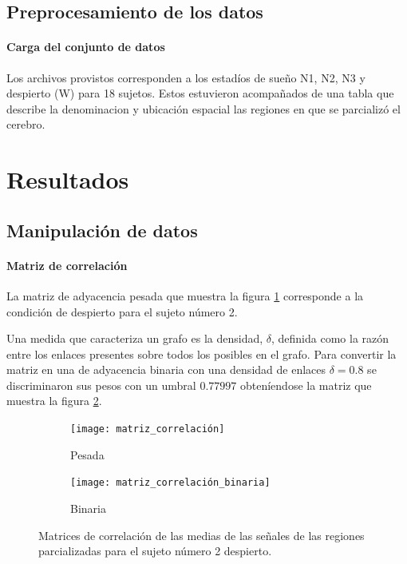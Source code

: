 \documentclass{article}
\begin{document}
\subsection{Preprocesamiento de los datos}

\paragraph{Carga del conjunto de datos} 
Los archivos provistos corresponden a los estadíos de sueño N1, N2, N3 y despierto (W) para 18 sujetos.
Estos estuvieron acompañados de una tabla que describe la denominacion y  ubicación espacial las regiones en que se parcializó el cerebro.



\section{Resultados}

\subsection{Manipulación de datos}

\paragraph{Matriz de correlación}
La matriz de adyacencia pesada que muestra la figura \ref{fg:matriz_correlación_pesada} corresponde a la condición de despierto para el sujeto número 2.

Una medida que caracteriza un grafo es la densidad, $\delta$, definida como la razón entre los enlaces presentes sobre todos los posibles en el grafo.
Para convertir la matriz en una de adyacencia binaria con una densidad de enlaces \(\delta = 0.8\) se discriminaron sus pesos con un umbral \(0.77997\) obteníendose la matriz que muestra la figura \ref{fg:matriz_correlación_binaria}.

\begin{figure}[ht]
	\centering
	\begin{subfigure}[b]{0.39\textwidth}
		\texttt{[image: matriz\_correlación]}
		\caption{Pesada}
		\label{fg:matriz_correlación_pesada}
	\end{subfigure}
	\begin{subfigure}[b]{0.33\textwidth}
		\texttt{[image: matriz\_correlación\_binaria]}
		\caption{Binaria}
		\label{fg:matriz_correlación_binaria}
	\end{subfigure}
	\caption{Matrices de correlación de las medias de las señales de las regiones parcializadas para el sujeto número 2 despierto. 
	}
	\label{fg:matriz_correlación}
\end{figure}
\end{document}
